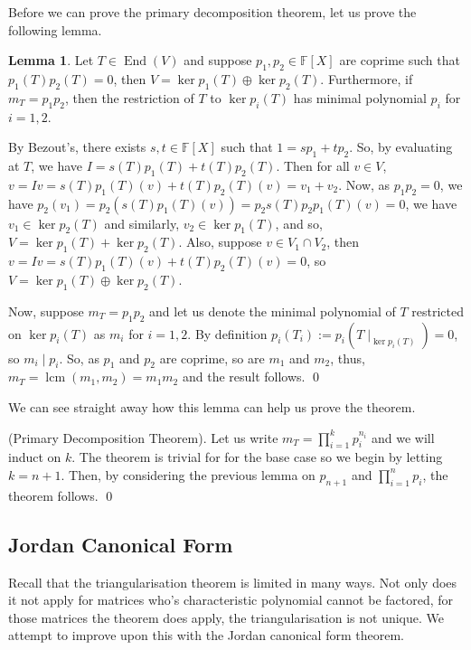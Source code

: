 \documentclass[
]{article}
\theoremstyle{definition}
\newtheorem{lemma}{Lemma}[section]
\theoremstyle{definition}
\begin{document}
Before we can prove the primary decomposition theorem, let us prove the
following lemma.

\begin{lemma}
  Let \(T \in \mathop{\mathrm{End}}(V)\) and suppose \(p_1, p_2 \in \mathbb{F}[X]\) are coprime 
  such that \(p_1(T)p_2(T) = 0\), then \(V = \ker p_1(T) \oplus \ker p_2(T)\). 
  Furthermore, if \(m_T = p_1 p_2\), then the restriction of \(T\) to 
  \(\ker p_i(T)\) has minimal polynomial \(p_i\) for \(i = 1, 2\).
\end{lemma}
\proof

By Bezout's, there exists \(s, t \in \mathbb{F}[X]\) such that
\(1 = sp_1 + tp_2\). So, by evaluating at \(T\), we have
\(I = s(T)p_1(T) + t(T)p_2(T)\). Then for all \(v \in V\),
\(v = Iv = s(T)p_1(T)(v) + t(T)p_2(T)(v) = v_1 + v_2\). Now, as
\(p_1 p_2 = 0\), we have
\(p_2(v_1) = p_2(s(T)p_1(T)(v)) = p_2 s(T)p_2 p_1(T)(v) = 0\), we have
\(v_1 \in \ker p_2(T)\) and similarly, \(v_2 \in \ker p_1(T)\), and so,
\(V = \ker p_1(T) + \ker p_2(T)\). Also, suppose \(v \in V_1 \cap V_2\),
then \(v = Iv = s(T)p_1(T)(v) + t(T)p_2(T)(v) = 0\), so
\(V = \ker p_1(T) \oplus \ker p_2(T)\).

Now, suppose \(m_T = p_1 p_2\) and let us denote the minimal polynomial
of \(T\) restricted on \(\ker p_i(T)\) as \(m_i\) for \(i = 1, 2\). By
definition \(p_i(T_i) := p_i(T \mid_{\ker p_i(T)}) = 0\), so
\(m_i \mid p_i\). So, as \(p_1\) and \(p_2\) are coprime, so are \(m_1\)
and \(m_2\), thus, \(m_T = \mathop{\mathrm{lcm}}(m_1, m_2) = m_1 m_2\)
and the result follows. \qed

We can see straight away how this lemma can help us prove the theorem.

\proof (Primary Decomposition Theorem). Let us write
\(m_T = \prod_{i = 1}^k p_i^{n_i}\) and we will induct on \(k\). The
theorem is trivial for for the base case so we begin by letting
\(k = n + 1\). Then, by considering the previous lemma on \(p_{n + 1}\)
and \(\prod_{i = 1}^n p_i\), the theorem follows. \qed

\hypertarget{jordan-canonical-form}{%
\subsection{Jordan Canonical Form}\label{jordan-canonical-form}}

Recall that the triangularisation theorem is limited in many ways. Not
only does it not apply for matrices who's characteristic polynomial
cannot be factored, for those matrices the theorem does apply, the
triangularisation is not unique. We attempt to improve upon this with
the Jordan canonical form theorem.
\end{document}
